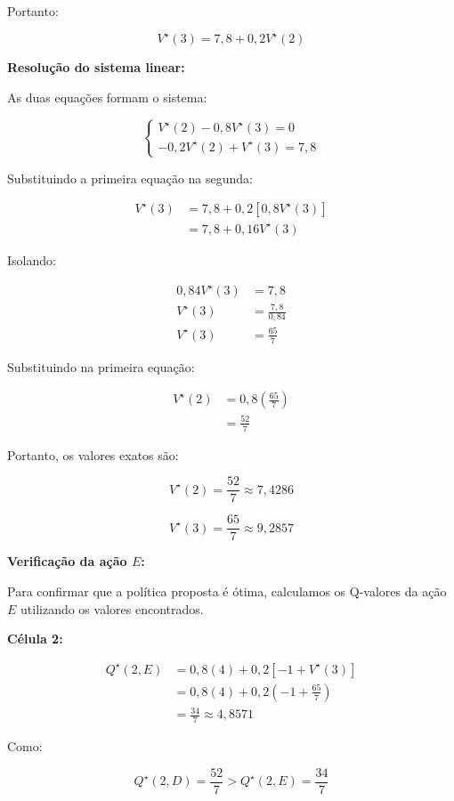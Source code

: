 Portanto:

\[
    V^\star(3)=7{,}8+0{,}2V^\star(2)
\]

\textbf{Resolução do sistema linear:}

As duas equações formam o sistema:

\[
\begin{cases}
V^\star(2)-0{,}8V^\star(3)=0\\
-0{,}2V^\star(2)+V^\star(3)=7{,}8
\end{cases}
\]

Substituindo a primeira equação na segunda:

\[
\begin{aligned}
V^\star(3)
&=7{,}8+0{,}2[0{,}8V^\star(3)]\\
&=7{,}8+0{,}16V^\star(3)
\end{aligned}
\]

Isolando:

\[
\begin{aligned}
0{,}84V^\star(3)&=7{,}8\\
V^\star(3)&=\frac{7{,}8}{0{,}84}\\
V^\star(3)&=\frac{65}{7}
\end{aligned}
\]

Substituindo na primeira equação:

\[
\begin{aligned}
V^\star(2)
&=0{,}8\left(\frac{65}{7}\right)\\
&=\frac{52}{7}
\end{aligned}
\]

Portanto, os valores exatos são:

\[
\boxed{
V^\star(2)=\frac{52}{7}\approx7{,}4286
}
\]

\[
\boxed{
V^\star(3)=\frac{65}{7}\approx9{,}2857
}
\]

\textbf{Verificação da ação $E$:}

Para confirmar que a política proposta é
ótima, calculamos os Q-valores da ação $E$
utilizando os valores encontrados.

\textbf{Célula 2:}

\[
\begin{aligned}
Q^\star(2,E)
&=0{,}8(4)+0{,}2[-1+V^\star(3)]\\
&=0{,}8(4)+0{,}2\left(-1+\frac{65}{7}\right)\\
&=\frac{34}{7}\approx4{,}8571
\end{aligned}
\]

Como:

\[
Q^\star(2,D)=\frac{52}{7}
>
Q^\star(2,E)=\frac{34}{7}
\]

